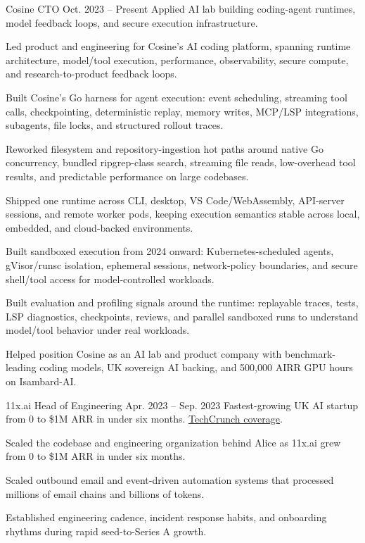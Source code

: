 
\ResumeJob
  {Cosine}
  {CTO}
  {Oct. 2023 -- Present}
  {Applied AI lab building coding-agent runtimes, model feedback loops, and secure execution infrastructure.}
\begin{ResumeList}
  \item Led product and engineering for Cosine's AI coding platform, spanning runtime architecture, model/tool execution, performance, observability, secure compute, and research-to-product feedback loops.
  \item Built Cosine's Go harness for agent execution: event scheduling, streaming tool calls, checkpointing, deterministic replay, memory writes, MCP/LSP integrations, subagents, file locks, and structured rollout traces.
  \item Reworked filesystem and repository-ingestion hot paths around native Go concurrency, bundled ripgrep-class search, streaming file reads, low-overhead tool results, and predictable performance on large codebases.
  \item Shipped one runtime across CLI, desktop, VS Code/WebAssembly, API-server sessions, and remote worker pods, keeping execution semantics stable across local, embedded, and cloud-backed environments.
  \item Built sandboxed execution from 2024 onward: Kubernetes-scheduled agents, gVisor/runsc isolation, ephemeral sessions, network-policy boundaries, and secure shell/tool access for model-controlled workloads.
  \item Built evaluation and profiling signals around the runtime: replayable traces, tests, LSP diagnostics, checkpoints, reviews, and parallel sandboxed runs to understand model/tool behavior under real workloads.
  \item Helped position Cosine as an AI lab and product company with benchmark-leading coding models, UK sovereign AI backing, and 500,000 AIRR GPU hours on Isambard-AI.
\end{ResumeList}

\ResumeJob
  {11x.ai}
  {Head of Engineering}
  {Apr. 2023 -- Sep. 2023}
  {Fastest-growing UK AI startup from 0 to \$1M ARR in under six months. \href{https://techcrunch.com/2023/08/11/11xai-closes-2-million-pre-seed-to-create-autonomous-ai-workers/}{TechCrunch coverage}.}
\begin{ResumeList}
  \item Scaled the codebase and engineering organization behind Alice as 11x.ai grew from 0 to \$1M ARR in under six months.
  \item Scaled outbound email and event-driven automation systems that processed millions of email chains and billions of tokens.
  \item Established engineering cadence, incident response habits, and onboarding rhythms during rapid seed-to-Series A growth.
\end{ResumeList}

